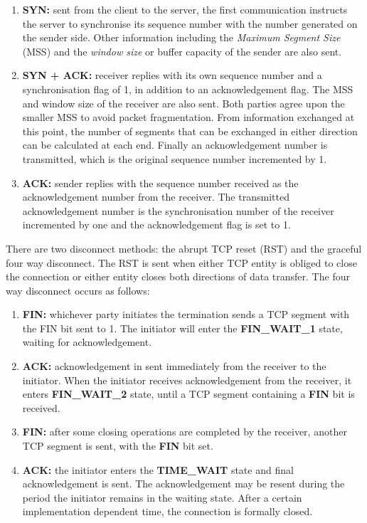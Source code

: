 \documentclass[10pt]{article}
\begin{document}
\begin{enumerate}
\item \textbf{SYN:} sent from the client to the server, the first communication instructs the server to synchronise its sequence number with the number generated on the sender side. Other information including the \emph{Maximum Segment Size} (MSS) and the \emph{window size} or buffer capacity of the sender are also sent.

\item \textbf{SYN + ACK:} receiver replies with its own sequence number and a synchronisation flag of 1, in addition to an acknowledgement flag. The MSS and window size of the receiver are also sent. Both parties agree upon the smaller MSS to avoid packet fragmentation. From information exchanged at this point, the number of segments that can be exchanged in either direction can be calculated at each end. Finally an acknowledgement number is transmitted, which is the original sequence number incremented by 1.

\item \textbf{ACK:} sender replies with the sequence number received as the acknowledgement number from the receiver. The transmitted acknowledgement number is the synchronisation number of the receiver incremented by one and the acknowledgement flag is set to 1.
\end{enumerate}

There are two disconnect methods: the abrupt TCP reset (RST) and the graceful four way disconnect. The RST is sent when either TCP entity is obliged to close the connection or either entity closes both directions of data transfer. The four way disconnect occurs as follows:

\begin{enumerate}
\item \textbf{FIN:} whichever party initiates the termination sends a TCP segment with the FIN bit sent to 1. The initiator will enter the \textbf{FIN\_WAIT\_1} state, waiting for acknowledgement.

\item \textbf{ACK:} acknowledgement in sent immediately from the receiver to the initiator. When the initiator receives acknowledgement from the receiver, it enters \textbf{FIN\_WAIT\_2} state, until a TCP segment containing a \textbf{FIN} bit is received.

\item \textbf{FIN:} after some closing operations are completed by the receiver, another TCP segment is sent, with the \textbf{FIN} bit set.

\item \textbf{ACK:} the initiator enters the \textbf{TIME\_WAIT} state and final acknowledgement is sent. The acknowledgement may be resent during the period the initiator remains in the waiting state. After a certain implementation dependent time, the connection is formally closed.
\end{enumerate}
\end{document}
